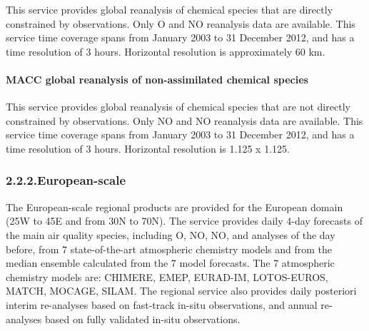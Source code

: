 \documentclass[9pt]{report}
\begin{document}
\noindent{}\mdbr
{}This service provides global reanalysis of chemical species that are directly constrained by observations.
Only O and NO reanalysis data are available. 
This service time coverage spans from January 2003 to 31 December 2012, and has a time resolution of 3 hours.
Horizontal resolution is approximately 60 km.%

\paragraph{MACC global reanalysis of non-assimilated chemical species}\label{sec-macc-global-reanalysis-of-non-assimilated-chemical-species}%

\noindent{}\mdbr
{}This service provides global reanalysis of chemical species that are not directly constrained by observations. 
Only NO and NO reanalysis data are available. 
This service time coverage spans from January 2003 to 31 December 2012, and has a time resolution of 3 hours.
Horizontal resolution is 1.125\textdegree{} x 1.125\textdegree{}.%

\subsubsection{2.2.2.\hspace*{0.5em}European-scale}\label{sec-european-scale}%

\noindent{}The European-scale regional products are provided for the European domain (25\textdegree{}W to 45\textdegree{}E and from 30\textdegree{}N to 70\textdegree{}N). 
The service provides daily 4-day forecasts of the main air quality species, including O, NO, NO, and analyses of the day before, from 7 state-of-the-art atmospheric chemistry models and from the median ensemble calculated from the 7 model forecasts. 
The 7 atmospheric chemistry models are: CHIMERE, EMEP, EURAD-IM, LOTOS-EUROS, MATCH, MOCAGE, SILAM.
The regional service also provides daily posteriori interim re-analyses based on fast-track in-situ observations, and annual re-analyses based on fully validated in-situ observations.%
\end{document}
